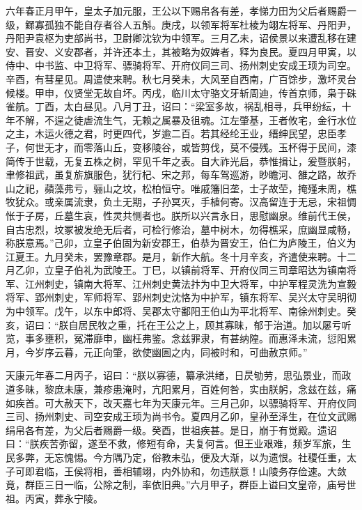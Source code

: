 \documentclass[]{article}
\begin{document}
六年春正月甲午，皇太子加元服，王公以下赐帛各有差，孝悌力田为父后者赐爵一级，鳏寡孤独不能自存者谷人五斛。庚戌，以领军将军杜棱为翊左将军、丹阳尹，丹阳尹袁枢为吏部尚书，卫尉卿沈钦为中领军。三月乙未，诏侯景以来遭乱移在建安、晋安、义安郡者，并许还本土，其被略为奴婢者，释为良民。夏四月甲寅，以侍中、中书监、中卫将军、骠骑将军、开府仪同三司、扬州刺史安成王顼为司空。辛酉，有彗星见。周遣使来聘。秋七月癸未，大风至自西南，广百馀步，激坏灵台候楼。甲申，仪贤堂无故自坏。丙戌，临川太守骆文牙斩周迪，传首京师，枭于硃雀航。丁酉，太白昼见。八月丁丑，诏曰：``梁室多故，祸乱相寻，兵甲纷纭，十年不解，不逞之徒虐流生气，无赖之属暴及徂魂。江左肇基，王者攸宅，金行水位之主，木运火德之君，时更四代，岁逾二百。若其经纶王业，缙绅民望，忠臣孝子，何世无才，而零落山丘，变移陵谷，或皆剪伐，莫不侵残。玉杯得于民间，漆简传于世载，无复五株之树，罕见千年之表。自大祚光启，恭惟揖让，爰暨朕躬，聿修祖武，虽复旂旗服色，犹行杞、宋之邦，每车驾巡游，眇瞻河、雒之路，故乔山之祀，蘋藻弗亏，骊山之坟，松柏恒守。唯戚籓旧垄，士子故茔，掩殣未周，樵牧犹众。或亲属流隶，负土无期，子孙冥灭，手植何寄。汉高留连于无忌，宋祖惆怅于子房，丘墓生哀，性灵共恻者也。朕所以兴言永日，思慰幽泉。维前代王侯，自古忠烈，坟冢被发绝无后者，可检行修治，墓中树木，勿得樵采，庶幽显咸畅，称朕意焉。''己卯，立皇子伯固为新安郡王，伯恭为晋安王，伯仁为庐陵王，伯义为江夏王。九月癸未，罢豫章郡。是月，新作大航。冬十月辛亥，齐遣使来聘。十二月乙卯，立皇子伯礼为武陵王。丁巳，以镇前将军、开府仪同三司章昭达为镇南将军、江州刺史，镇南大将军、江州刺史黄法抃为中卫大将军，中护军程灵洗为宣毅将军、郢州刺史，军师将军、郢州刺史沈恪为中护军，镇东将军、吴兴太守吴明彻为中领军。戊午，以东中郎将、吴郡太守鄱阳王伯山为平北将军、南徐州刺史。癸亥，诏曰：``朕自居民牧之重，托在王公之上，顾其寡昧，郁于治道。加以屡亏听览，事多壅积，冤滞靡申，幽枉弗鉴。念兹罪隶，有甚纳隍。而惠泽未流，愆阳累月，今岁序云暮，元正向肇，欲使幽圄之内，同被时和，可曲赦京师。''

天康元年春二月丙子，诏曰：``朕以寡德，纂承洪绪，日昃劬劳，思弘景业，而政道多昧，黎庶未康，兼疹患淹时，亢阳累月，百姓何咎，实由朕躬，念兹在兹，痛如疾首。可大赦天下，改天嘉七年为天康元年。三月己卯，以骠骑将军、开府仪同三司、扬州刺史、司空安成王顼为尚书令。夏四月乙卯，皇孙至泽生，在位文武赐绢帛各有差，为父后者赐爵一级。癸酉，世祖疾甚。是日，崩于有觉殿。遗诏曰：``朕疾苦弥留，遂至不救，修短有命，夫复何言。但王业艰难，频岁军旅，生民多弊，无忘愧惕。今方隅乃定，俗教未弘，便及大渐，以为遗恨。社稷任重，太子可即君临，王侯将相，善相辅翊，内外协和，勿违朕意！山陵务存俭速。大敛竟，群臣三日一临，公除之制，率依旧典。''六月甲子，群臣上谥曰文皇帝，庙号世祖。丙寅，葬永宁陵。
\end{document}
